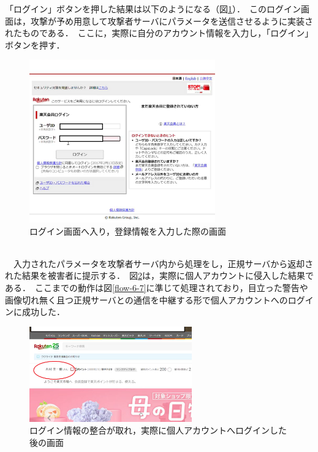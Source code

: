\documentclass[dvipdfmx]{jsarticle}
\begin{document}
                    \clearpage
                    「ログイン」ボタンを押した結果は以下のようになる（図\ref{rakuten-04}）．\
                    このログイン画面は，攻撃が予め用意して攻撃者サーバにパラメータを送信させるように実装されたものである．\
                    ここに，実際に自分のアカウント情報を入力し，「ログイン」ボタンを押す．\
                    \begin{figure}[pth]
                        \centering
                        \includegraphics[height=7cm]{img/rakuten/rakuten-04.png}
                        \caption{ログイン画面へ入り，登録情報を入力した際の画面}
                        \label{rakuten-04}
                    \end{figure}
                    \\
                    　入力されたパラメータを攻撃者サーバ内から処理をし，正規サーバから返却された結果を被害者に提示する．\
                    図\ref{rakuten-05}は，実際に個人アカウントに侵入した結果である．\
                    ここまでの動作は図\ref{flow-6-7}に準じて処理されており，目立った警告や画像切れ無く且つ正規サーバとの通信を中継する形で個人アカウントへのログインに成功した．\
                    \begin{figure}[pth]
                        \centering
                        \includegraphics[width=7cm]{img/rakuten/rakuten-05.png}
                        \caption{ログイン情報の整合が取れ，実際に個人アカウントへログインした後の画面}
                        \label{rakuten-05}
                    \end{figure}
                    \clearpage
\end{document}
